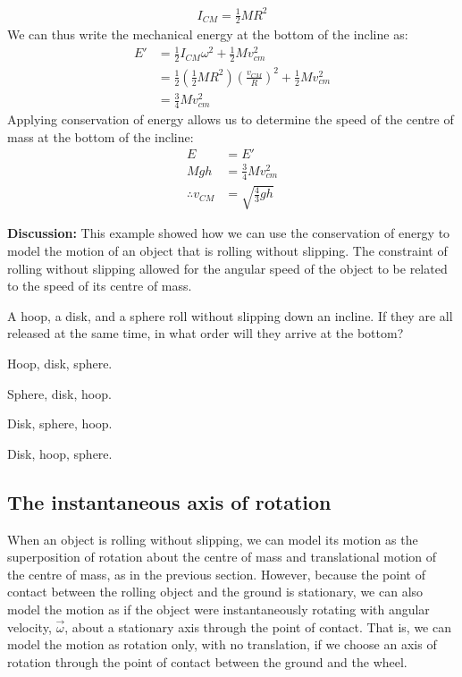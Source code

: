 \begin{example}
\begin{align*}
I_{CM}=\frac{1}{2}MR^2
\end{align*}
We can thus write the mechanical energy at the bottom of the incline as:
\begin{align*}
E' &= \frac{1}{2}I_{CM}\omega^2 + \frac{1}{2}Mv_{cm}^2\\
&=\frac{1}{2}\left(  \frac{1}{2}MR^2 \right) \left(  \frac{v_{CM}}{R}\right)^2+ \frac{1}{2}Mv_{cm}^2\\
&=\frac{3}{4}Mv_{cm}^2
\end{align*}
Applying conservation of energy allows us to determine the speed of the centre of mass at the bottom of the incline:
\begin{align*}
E &= E'\\
Mgh &= \frac{3}{4}Mv_{cm}^2\\
\therefore v_{CM} &= \sqrt{\frac{4}{3}gh}
\end{align*}

\textbf{Discussion:} This example showed how we can use the conservation of energy to model the motion of an object that is rolling without slipping. The constraint of rolling without slipping allowed for the angular speed of the object to be related to the speed of its centre of mass.
\end{example}

\begin{checkpoint}
\begin{MCquestion}{A hoop, a disk, and a sphere roll without slipping down an incline. If they are all released at the same time, in what order will they arrive at the bottom?}
\item Hoop, disk, sphere.
\item Sphere, disk, hoop. \correct
\item Disk, sphere, hoop.
\item Disk, hoop, sphere.
\end{MCquestion}
\end{checkpoint}

\subsection{The instantaneous axis of rotation}

When an object is rolling without slipping, we can model its motion as the superposition of rotation about the centre of mass and translational motion of the centre of mass, as in the previous section. However, because the point of contact between the rolling object and the ground is stationary, we can also model the motion as if the object were instantaneously rotating with angular velocity, $\vec \omega$, about a stationary axis through the point of contact. That is, we can model the motion as rotation only, with no translation, if we choose an axis of rotation through the point of contact between the ground and the wheel.


